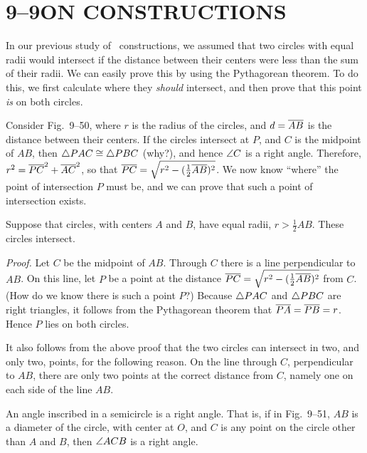 \documentclass[11pt]{book}
\begin{document}
\section*{9--9\quad ON CONSTRUCTIONS}

In our previous study of \RC\ constructions, we assumed that two circles with
equal radii would intersect if the distance between their centers were less than
the sum of their radii. We can easily prove this by using the Pythagorean
theorem. To do this, we first calculate where they \emph{should} intersect, and
then prove that this point \emph{is} on both circles.

\FIGIXFIFTYFIFTYONE

Consider Fig.~9--50, where $r$ is the radius of the circles, and $d = \overline{AB}$ is
the distance between their centers. If the circles intersect at $P$, and $C$ is
the midpoint of $AB$, then
$\triangle PAC \cong \triangle PBC$ (why?), and hence $\angle C$ is a right angle.
Therefore, $r^2 = \overline{PC}^2 + \overline{AC}^2$, so that
$\overline{PC} = \sqrt{r^2 - (\frac{1}{2}\overline{AB})^2}$. We now know ``where'' the point
of intersection $P$ must be, and we can prove that such a point of intersection
exists.

\begin{theorem}
Suppose that circles, with centers $A$ and $B$, have equal radii,
$r > \frac{1}{2}AB$. These circles intersect.
\end{theorem}

\noindent\emph{Proof.} Let $C$ be the midpoint of $AB$. Through $C$ there is a
line perpendicular to $AB$. On this line, let $P$ be a point at the distance
$\overline{PC} = \sqrt{r^2 - (\frac{1}{2}\overline{AB})^2}$ from $C$. (How do we know there
is such a point $P$?) Because $\triangle PAC$ and $\triangle PBC$ are right triangles, it
follows from the Pythagorean theorem that $\overline{PA} = \overline{PB} = r$. Hence $P$ lies
on both circles.

\begin{remark}
It also follows from the above proof that the two circles can intersect in two,
and only two, points, for the following reason. On the line through $C$,
perpendicular to $AB$, there are only two points at the correct distance from
$C$, namely one on each side of the line $AB$.
\end{remark}

\begin{theorem}
An angle inscribed in a semicircle is a right angle. That is, if in Fig.~9--51,
$AB$ is a diameter of the circle, with center at $O$, and $C$ is any point on the
circle other than $A$ and $B$, then $\angle ACB$ is a right angle.
\end{theorem}
\end{document}
